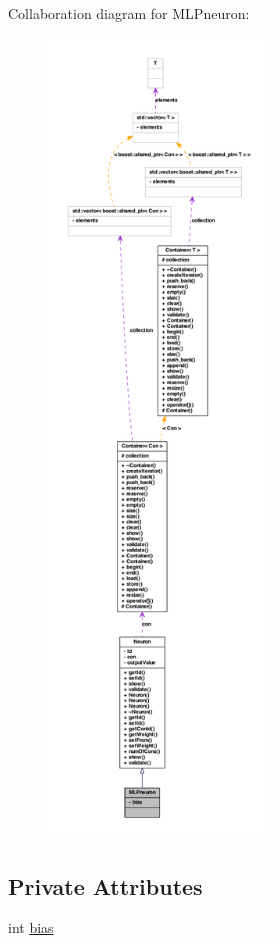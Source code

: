 Collaboration diagram for MLPneuron:
\nopagebreak
\begin{figure}[H]
\begin{center}
\leavevmode
\includegraphics[height=600pt]{class_m_l_pneuron__coll__graph}
\end{center}
\end{figure}
\subsection*{Private Attributes}
\begin{DoxyCompactItemize}
\item 
int \hyperlink{class_m_l_pneuron_a6f8cb5b2fbf48db003ea8a413ffdbd8b}{bias}
\end{DoxyCompactItemize}


